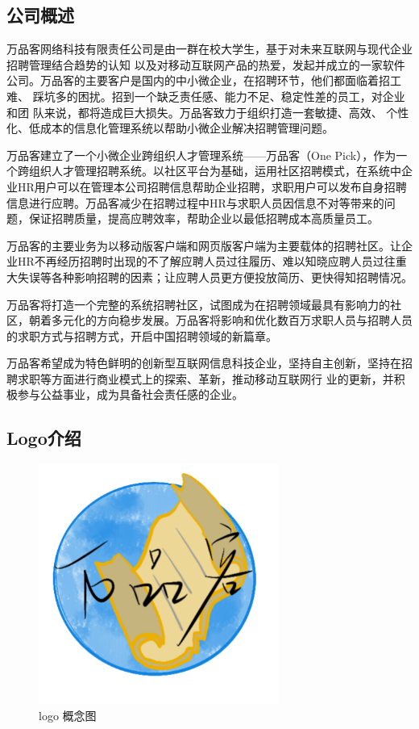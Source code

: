 \documentclass[UTF8]{ctexart}
\begin{document}
\subsection{公司概述}
万品客网络科技有限责任公司是由一群在校大学生，基于对未来互联网与现代企业招聘管理结合趋势的认知 以及对移动互联网产品的热爱，发起并成立的一家软件公司。万品客的主要客户是国内的中小微企业，在招聘环节，他们都面临着招工难、 踩坑多的困扰。招到一个缺乏责任感、能力不足、稳定性差的员工，对企业和团 队来说，都将造成巨大损失。万品客致力于组织打造一套敏捷、高效、 个性化、低成本的信息化管理系统以帮助小微企业解决招聘管理问题。

万品客建立了一个小微企业跨组织人才管理系统——万品客（One Pick），作为一个跨组织人才管理招聘系统。以社区平台为基础，运用社区招聘模式，在系统中企业HR用户可以在管理本公司招聘信息帮助企业招聘，求职用户可以发布自身招聘信息进行应聘。万品客减少在招聘过程中HR与求职人员因信息不对等带来的问题，保证招聘质量，提高应聘效率，帮助企业以最低招聘成本高质量员工。

万品客的主要业务为以移动版客户端和网页版客户端为主要载体的招聘社区。让企业HR不再经历招聘时出现的不了解应聘人员过往履历、难以知晓应聘人员过往重大失误等各种影响招聘的因素；让应聘人员更方便投放简历、更快得知招聘情况。

万品客将打造一个完整的系统招聘社区，试图成为在招聘领域最具有影响力的社区，朝着多元化的方向稳步发展。万品客将影响和优化数百万求职人员与招聘人员的求职方式与招聘方式，开启中国招聘领域的新篇章。

万品客希望成为特色鲜明的创新型互联网信息科技企业，坚持自主创新，坚持在招聘求职等方面进行商业模式上的探索、革新，推动移动互联网行 业的更新，并积极参与公益事业，成为具备社会责任感的企业。
\subsection{Logo介绍}
\begin{figure}[H] %
	\centering %
	\includegraphics[width=0.7\textwidth]{pics/logo.png} %
	\caption{logo 概念图} %
	\label{Fig.main2} %
\end{figure}
\end{document}
